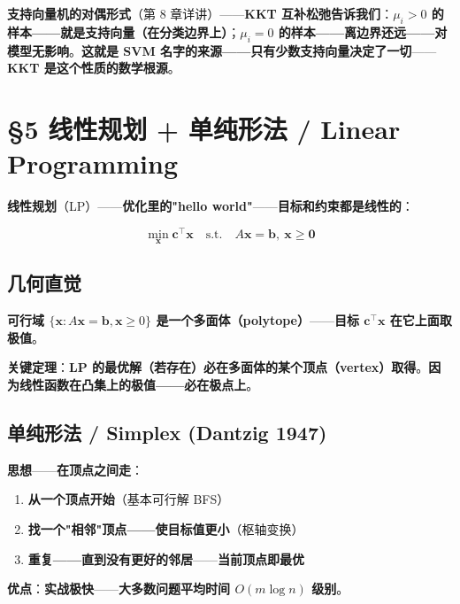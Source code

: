\begin{example}
\textbf{支持向量机的对偶形式}（第 8 章详讲）——\textbf{KKT 互补松弛告诉我们}：\textbf{$\mu_i > 0$ 的样本——就是\textbf{支持向量}（在分类边界上）}；\textbf{$\mu_i = 0$ 的样本——离边界还远——对模型\textbf{无影响}}。\textbf{这就是 SVM 名字的来源——\textbf{只有少数支持向量决定了一切}}——\textbf{KKT 是这个性质的数学根源}。
\end{example}

\section{§5 线性规划 + 单纯形法 / Linear Programming}

\textbf{线性规划}（LP）——\textbf{优化里的"hello world"}——\textbf{目标和约束\textbf{都是线性的}}：

\begin{equation}
\min_{\bm x} \bm c^\top \bm x \quad \text{s.t.} \quad A \bm x = \bm b, \ \bm x \ge \bm 0
\end{equation}

\subsection{几何直觉}

\textbf{可行域 $\{\bm x : A\bm x = \bm b, \bm x \ge 0\}$ 是一个\textbf{多面体}（polytope）}——\textbf{目标 $\bm c^\top \bm x$ 在它上面取极值}。

\textbf{关键定理}：\textbf{LP 的最优解（若存在）必在多面体的某个\textbf{顶点}（vertex）取得}。\textbf{因为线性函数在凸集上的极值——必在\textbf{极点}上}。

\subsection{单纯形法 / Simplex (Dantzig 1947)}

\textbf{思想}——\textbf{在顶点之间走}：

\begin{enumerate}
\item \textbf{从一个顶点开始}（基本可行解 BFS）
\item \textbf{找一个"相邻"顶点——使目标值更小}（枢轴变换）
\item \textbf{重复——直到没有更好的邻居}——\textbf{当前顶点即最优}
\end{enumerate}

\textbf{优点}：\textbf{实战极快}——\textbf{大多数问题平均时间 $O(m \log n)$ 级别}。

